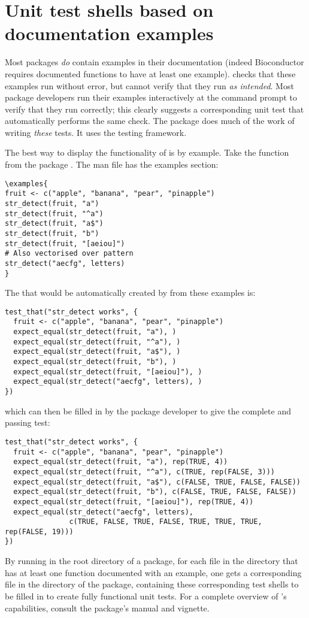 \section{Unit test shells based on documentation examples}
Most packages \emph{do} contain examples in their documentation (indeed Bioconductor \citep{bioc} requires documented functions to have at least one example).  checks that these examples run without error, but cannot verify that they run \emph{as intended}. Most package developers run their examples interactively at the command prompt to verify that they run correctly; this clearly suggests a corresponding unit test that automatically performs the same check. The  package \citep{exampletestr} does much of the work of writing \emph{these} tests. It uses the  testing framework.

The best way to display the functionality of  is by example. Take the  function from the  package \citep{stringr}. The man file  has the examples section:
\begin{verbatim}
\examples{
fruit <- c("apple", "banana", "pear", "pinapple")
str_detect(fruit, "a")
str_detect(fruit, "^a")
str_detect(fruit, "a$")
str_detect(fruit, "b")
str_detect(fruit, "[aeiou]")
# Also vectorised over pattern
str_detect("aecfg", letters)
}
\end{verbatim}
The  that would be automatically created by  from these examples is:
\begin{verbatim}
test_that("str_detect works", {
  fruit <- c("apple", "banana", "pear", "pinapple")
  expect_equal(str_detect(fruit, "a"), )
  expect_equal(str_detect(fruit, "^a"), )
  expect_equal(str_detect(fruit, "a$"), )
  expect_equal(str_detect(fruit, "b"), )
  expect_equal(str_detect(fruit, "[aeiou]"), )
  expect_equal(str_detect("aecfg", letters), )
})
\end{verbatim}
which can then be filled in by the package developer to give the complete and passing test:
\begin{verbatim}
test_that("str_detect works", {
  fruit <- c("apple", "banana", "pear", "pinapple")
  expect_equal(str_detect(fruit, "a"), rep(TRUE, 4))
  expect_equal(str_detect(fruit, "^a"), c(TRUE, rep(FALSE, 3)))
  expect_equal(str_detect(fruit, "a$"), c(FALSE, TRUE, FALSE, FALSE))
  expect_equal(str_detect(fruit, "b"), c(FALSE, TRUE, FALSE, FALSE))
  expect_equal(str_detect(fruit, "[aeiou]"), rep(TRUE, 4))
  expect_equal(str_detect("aecfg", letters),
               c(TRUE, FALSE, TRUE, FALSE, TRUE, TRUE, TRUE, rep(FALSE, 19)))
})
\end{verbatim}
By running  in the root directory of a package, for each  file in the  directory that has at least one function documented with an example, one gets a corresponding file  in the  directory of the package, containing these corresponding test shells to be filled in to create fully functional unit tests.
For a complete overview of 's capabilities, consult the package's manual and vignette.

